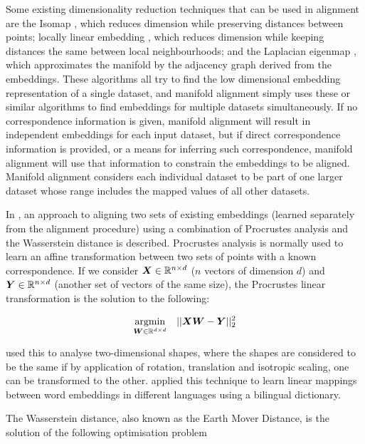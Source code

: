 Some existing dimensionality reduction techniques that can be used in alignment are the Isomap \cite{Isomap}, which reduces dimension while preserving distances between points; locally linear embedding \cite {LocallyLinearEmbedding}, which reduces dimension while keeping distances the same between local neighbourhoods; and the Laplacian eigenmap \cite{LaplacianEigenmaps}, which approximates the manifold by the adjacency graph derived from the embeddings. These algorithms all try to find the low dimensional embedding representation of a single dataset, and manifold alignment simply uses these or similar algorithms to find embeddings for multiple datasets simultaneously. If no correspondence information is given, manifold alignment will result in independent embeddings for each input dataset, but if direct correspondence information is provided, or a means for inferring such correspondence, manifold alignment will use that information to constrain the embeddings to be aligned. Manifold alignment considers each individual dataset to be part of one larger dataset whose range includes the mapped values of all other datasets. 

In \cite{UnsupervisedAlignmentWP}, an approach to aligning two sets of existing embeddings (learned separately from the alignment procedure) using a combination of Procrustes analysis and the Wasserstein distance is described. Procrustes analysis is normally used to learn an affine transformation between two sets of points with a known correspondence. If we consider $\boldsymbol{X} \in \mathbb{R}^{n \times d}$ ($n$ vectors of dimension $d$) and $\boldsymbol{Y} \in \mathbb{R}^{n \times d}$ (another set of vectors of the same size), the Procrustes linear transformation is the solution to the following:

\begin{equation}
    \underset{\boldsymbol{W} \in \mathbb{R}^{d \times d}}{\operatorname{argmin}} \quad  ||\boldsymbol{X} \boldsymbol{W} - \boldsymbol{Y}||_2^2
\end{equation}

\cite{Goodall1991ProcrustesMI} used this to analyse two-dimensional shapes, where the shapes are considered to be the same if by application of rotation, translation and isotropic scaling, one can be transformed to the other. \cite{MikolovMachineTranslation} applied this technique to learn linear mappings between word embeddings in different languages using a bilingual dictionary. 

The Wasserstein distance, also known as the Earth Mover Distance, is the solution of the following optimisation problem


